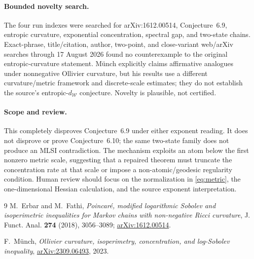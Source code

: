 \documentclass[11pt]{article}
\newcommand{\W}{\mathcal W}
\begin{document}
\paragraph{Bounded novelty search.}
The four run indexes were searched for arXiv:1612.00514, Conjecture~6.9,
entropic curvature, exponential concentration, spectral gap, and two-state
chains. Exact-phrase, title/citation, author, two-point, and close-variant
web/arXiv searches through 17 August 2026 found no counterexample to the
original entropic-curvature statement. M\"unch \cite{M} explicitly claims
affirmative analogues under nonnegative Ollivier curvature, but his results
use a different curvature/metric framework and discrete-scale estimates;
they do not establish the source's entropic-$d_{\W}$ conjecture. Novelty is
plausible, not certified.

\paragraph{Scope and review.}
This completely disproves Conjecture~6.9 under either exponent reading. It
does not disprove or prove Conjecture~6.10; the same two-state family does not
produce an MLSI contradiction. The mechanism exploits an atom below the
first nonzero metric scale, suggesting that a repaired theorem must truncate
the concentration rate at that scale or impose a non-atomic/geodesic
regularity condition. Human review should focus on the normalization in
\eqref{eq:metric}, the one-dimensional Hessian calculation, and the source
exponent interpretation.

\begingroup
\sloppy
\raggedright
\begin{thebibliography}{9}
M.~Erbar and M.~Fathi,
\emph{Poincar\'e, modified logarithmic Sobolev and isoperimetric inequalities
for Markov chains with non-negative Ricci curvature},
J. Funct. Anal. \textbf{274} (2018), 3056--3089;
\href{https://arxiv.org/abs/1612.00514}{arXiv:1612.00514}.

F.~M\"unch,
\emph{Ollivier curvature, isoperimetry, concentration, and log-Sobolev
inequality},
\href{https://arxiv.org/abs/2309.06493}{arXiv:2309.06493}, 2023.
\end{thebibliography}
\endgroup
\end{document}
